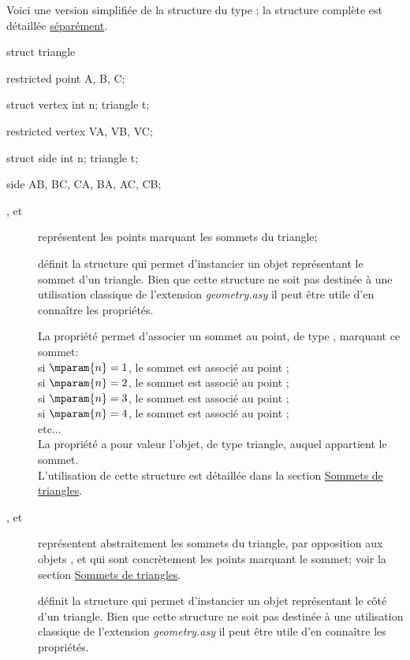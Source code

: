 \documentclass[pdftex]{article}
\newcommand{\geo}{l'extension \emph{geometry.asy}\xspace}
\begin{document}
Voici une version simplifiée de la structure du type ;
la structure complète est détaillée
\href{http://piprim.tuxfamily.org/asymptote/geometry/modules/geometry.asy.index.sign.html#struct\%20triangle}{séparément}.
\begin{center}
  \begin{Vcolor}
    struct triangle {
      restricted point A, B, C;

      struct vertex {
        int n;
        triangle t; }

      restricted vertex VA, VB, VC;

      struct side {
        int n;
        triangle t; }

      side AB, BC, CA, BA, AC, CB; }
  \end{Vcolor}
\end{center}
\begin{description}
\item[,  et ] représentent les points
  marquant les sommets du triangle;
\item[] définit la structure  qui
  permet d'instancier un objet représentant le sommet d'un triangle.
  Bien que cette structure ne soit pas destinée à une utilisation
  classique de \geo il peut être utile d'en connaître les propriétés.

  La propriété  permet d'associer un sommet au point, de type
  , marquant ce sommet:\\
  si $\mparam{n}=1$, le sommet est associé au point ;\\
  si $\mparam{n}=2$, le sommet est associé au point ;\\
  si $\mparam{n}=3$, le sommet est associé au point ;\\
  si $\mparam{n}=4$, le sommet est associé au point ;\\
  etc...\\
  La propriété  a pour valeur \og{}l'objet, de type triangle,
  auquel appartient le sommet\fg{}.\\
  L'utilisation de cette structure est détaillée dans la section
  \href{#subsection.vertex}{Sommets de triangles}.
\item[,  et ] représentent abstraitement
  les sommets du triangle, par opposition aux objets
   ,  et  qui sont concrètement
  les points marquant le sommet; voir la section
  \href{#subsection.vertex}{Sommets de triangles}.
\item[] définit la structure  qui
  permet d'instancier un objet représentant le côté d'un triangle.
  Bien que cette structure ne soit pas destinée à une utilisation
  classique de \geo il peut être utile d'en connaître les propriétés.


\end{description}
\end{document}
